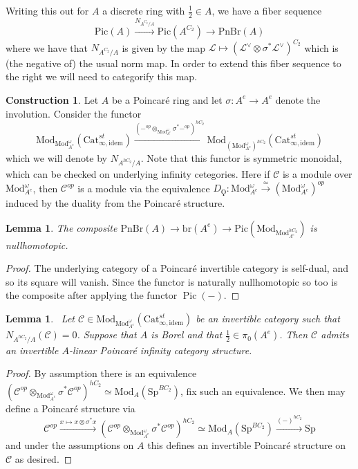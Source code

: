 \documentclass{article}
\DeclareMathOperator{\Pic}{Pic} %
\newcommand{\pnbr}{\ensuremath{\mathrm{PnBr}}}
\newcommand{\pic}{\ensuremath{\mathrm{Pic}}}
\newtheorem{lemma}[equation]{Lemma}
\theoremstyle{definition}
\newtheorem{construction}[equation]{Construction}
\begin{document}
Writing this out for $A$ a discrete ring with $\frac{1}{2}\in A$, we have a fiber sequence \[\pic(A)\xrightarrow{N_{A^{C_2}/A}}\pic(A^{C_2})\to \pnbr(A)\] where we have that $N_{A^{C_2}/A}$ is given by the map $\mathcal{L}\mapsto (\mathcal{L}^{\vee}\otimes \sigma^*\mathcal{L}^\vee)^{C_2}$ which is (the negative of) the usual norm map. In order to extend this fiber sequence to the right we will need to categorify this map.
	
	\begin{construction}
		Let $A$ be a Poincar{\'e} ring and let $\sigma: A^e\to A^e$ denote the involution. Consider the functor \[\mathrm{Mod}_{\mathrm{Mod}_{A^{e}}^\omega}(\mathrm{Cat}_{\infty, \textrm{idem}}^{st})\xrightarrow{\left(-^{op}\otimes_{\mathrm{Mod}_{A^e}^\omega} \sigma^*-^{op}\right)^{hC_2}}\mathrm{Mod}_{(\mathrm{Mod}_{A^e}^\omega)^{hC_2}}(\mathrm{Cat}_{\infty, \textrm{idem}}^{st})\] which we will denote by $N_{A^{hC_2}/A}$. Note that this functor is symmetric monoidal, which can be checked on underlying infinity cetegories. Here if $\mathcal{C}$ is a module over $\mathrm{Mod}_{A^e}^{\omega}$, then $\mathcal{C}^{op}$ is a module via the equivalence $D_\Qoppa:\mathrm{Mod}_{A^e}^\omega\xrightarrow{\simeq}(\mathrm{Mod}_{A^e}^\omega)^{op}$ induced by the duality from the Poincar{\'e} structure. 
	\end{construction}
	
	\begin{lemma}
		The composite $\pnbr(A)\to \mathrm{br}(A^e)\to \mathrm{Pic}(\mathrm{Mod}_{\mathrm{Mod}_{A^e}^{hC_2}})$ is nullhomotopic. 
	\end{lemma}
	\begin{proof}
		The underlying category of a Poincar{\'e} invertible category is self-dual, and so its square will vanish. Since the functor is naturally nullhomotopic so too is the composite after applying the functor $\Pic(-)$.
	\end{proof}

    \begin{lemma}~\label{lem: surjection onto kernel PS sequence}
        Let $\mathcal{C}\in \mathrm{Mod}_{\mathrm{Mod}_{A^e}^\omega}(\mathrm{Cat}^{st}_{\infty,\textrm{idem}})$ be an invertible category such that $N_{A^{hC_2}/A}(\mathcal{C})=0$. Suppose that $A$ is Borel and that $\frac{1}{2}\in \pi_0(A^e)$. Then $\mathcal{C}$ admits an invertible $A$-linear Poincar{\'e} infinity category structure.
    \end{lemma}
    \begin{proof}
        By assumption there is an equivalence $(\mathcal{C}^{op}\otimes_{\mathrm{Mod}_{A^e}^\omega}\sigma^*\mathcal{C}^{op})^{hC_2}\simeq \mathrm{Mod}_{A}(\mathrm{Sp}^{BC_2})$, fix such an equivalence. We then may define a Poincar{\'e} structure via \[\mathcal{C}^{op}\xrightarrow{x\mapsto x\otimes \sigma^*x}\left(\mathcal{C}^{op}\otimes_{\mathrm{Mod}_{A^e}^\omega}\sigma^*\mathcal{C}^{op}\right)^{hC_2}\simeq \mathrm{Mod}_A(\mathrm{Sp}^{BC_2})\xrightarrow{(-)^{hC_2}}\mathrm{Sp}\] and under the assumptions on $A$ this defines an invertible Poincar{\'e} structure on $\mathcal{C}$ as desired.
    \end{proof}
	
\end{document}
